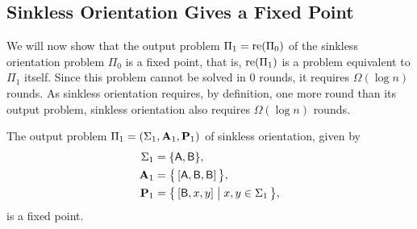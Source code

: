 \subsection{Sinkless Orientation Gives a Fixed Point}

We will now show that the output problem $\Pi_1 = \operatorname{re}(\Pi_0)$ of the sinkless orientation problem $\Pi_0$ is a fixed point, that is, $\operatorname{re}(\Pi_1)$ is a problem equivalent to $\Pi_1$ itself. Since this problem cannot be solved in 0 rounds, it requires $\Omega(\log n)$ rounds. As sinkless orientation requires, by definition, one more round than its output problem, sinkless orientation also requires $\Omega(\log n)$ rounds.

\begin{lemma}
	The output problem $\Pi_1 = (\Sigma_1, \mathbf{A}_1, \mathbf{P}_1)$ of sinkless orientation, given by
	\begin{align*}
		\Sigma_1 &= \{ \mathsf{A}, \mathsf{B} \}, \\
		\mathbf{A}_1 &= \bigl\{ \, [\mathsf{A}, \mathsf{B}, \mathsf{B} ] \, \bigr\}, \\
		\mathbf{P}_1 &= \bigl\{ \, [\mathsf{B}, x, y] \bigm| x,y \in \Sigma_1 \, \bigr\},
	\end{align*}
	is a fixed point.
\end{lemma}

